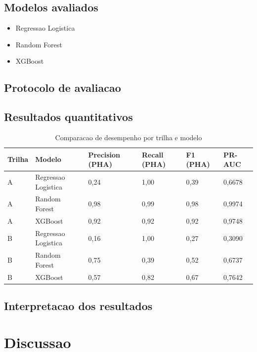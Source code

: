 \documentclass[conference]{IEEEtran}
\begin{document}
\subsection{Modelos avaliados}
\begin{itemize}[leftmargin=*]
    \item Regressao Logistica
    \item Random Forest
    \item XGBoost
\end{itemize}

\subsection{Protocolo de avaliacao}

\subsection{Resultados quantitativos}
\begin{table}[!t]
\centering
\caption{Comparacao de desempenho por trilha e modelo}
\footnotesize
\begin{tabular}{llllll}
\toprule
Trilha & Modelo & Precision (PHA) & Recall (PHA) & F1 (PHA) & PR-AUC \\
\midrule
A & Regressao Logistica & 0,24 & 1,00 & 0,39 & 0,6678 \\
A & Random Forest & 0,98 & 0,99 & 0,98 & 0,9974 \\
A & XGBoost & 0,92 & 0,92 & 0,92 & 0,9748 \\
B & Regressao Logistica & 0,16 & 1,00 & 0,27 & 0,3090 \\
B & Random Forest & 0,75 & 0,39 & 0,52 & 0,6737 \\
B & XGBoost & 0,57 & 0,82 & 0,67 & 0,7642 \\
\bottomrule
\end{tabular}
\label{tab:ml_resultados}
\end{table}

\subsection{Interpretacao dos resultados}

\section{Discussao}
\end{document}
